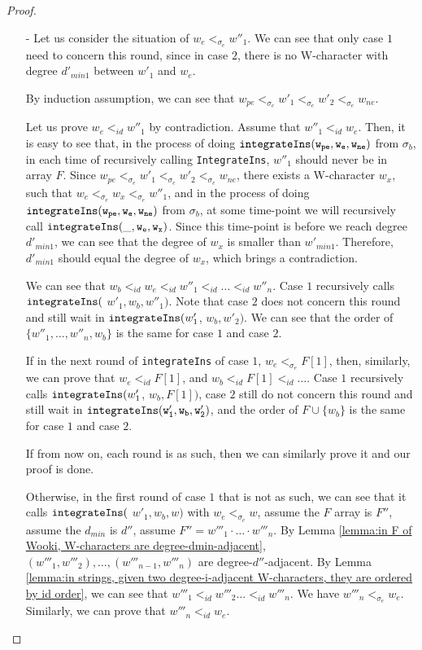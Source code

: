 \begin {proof}
\begin{itemize}
    \begin{itemize}
    \setlength{\itemsep}{0.5pt}
    \item[-] Let us consider the situation of $w_e <_{\sigma_e} w''_1$. We can see that only case $1$ need to concern this round, since in case $2$, there is no W-character with degree $d'_{min1}$ between $w'_1$ and $w_e$.

        By induction assumption, we can see that $w_{pe} <_{\sigma_e} w'_1 <_{\sigma_e} w'_2 <_{\sigma_e} w_{ne}$.

        Let us prove $w_e <_{id} w''_1$ by contradiction. Assume that $w''_1 <_{id} w_e$. Then, it is easy to see that, in the process of doing $\alabelshort[{\tt integrateIns}]{w_{pe},w_e,w_{ne}}$ from $\sigma_b$, in each time of recursively calling {\tt IntegrateIns}, $w''_1$ should never be in array $F$. Since $w_{pe} <_{\sigma_e} w'_1 <_{\sigma_e} w'_2 <_{\sigma_e} w_{ne}$, there exists a W-character $w_x$, such that $w_e <_{\sigma_e} w_x <_{\sigma_e} w''_1$, and in the process of doing $\alabelshort[{\tt integrateIns}]{w_{pe},w_e,w_{ne}}$ from $\sigma_b$, at some time-point we will recursively call $\alabelshort[{\tt integrateIns}]{\_,w_e,w_x}$. Since this time-point is before we reach degree $d'_{min1}$, we can see that the degree of $w_x$ is smaller than $w'_{min1}$. Therefore, $d'_{min1}$ should equal the degree of $w_x$, which brings a contradiction.

        We can see that $w_b <_{id} w_e <_{id} w''_1 <_{id} \ldots <_{id} w''_n$. Case $1$ recursively calls ${\tt integrateIns(}$ $w'_1,w_b,w''_1)$. Note that case $2$ does not concern this round and still wait in ${\tt integrateIns}(w'_1$, $w_b,w'_2)$. We can see that the order of $\{ w''_1,\ldots,w''_n,w_b \}$ is the same for case $1$ and case $2$.

        If in the next round of {\tt integrateIns} of case $1$, $w_e <_{\sigma_e} F[1]$, then, similarly, we can prove that $w_e <_{id} F[1]$, and $w_b <_{id} F[1] <_{id}\ldots$. Case $1$ recursively calls ${\tt integrateIns}(w'_1$, $w_b,F[1])$, case $2$ still do not concern this round and still wait in $\alabelshort[{\tt integrateIns}]{w'_1,w_b,w'_2}$, and the order of $F \cup \{ w_b \}$ is the same for case $1$ and case $2$.

        If from now on, each round is as such, then we can similarly prove it and our proof is done.

        Otherwise, in the first round of case $1$ that is not as such, we can see that it calls ${\tt integrateIns(}$ $w'_1,w_b,w)$ with $w_e <_{\sigma_e} w$, assume the $F$ array is $F''$, assume the $d_{min}$ is $d''$, assume $F'' = w'''_1 \cdot \ldots \cdot w'''_n$. By Lemma \ref{lemma:in F of Wooki, W-characters are degree-dmin-adjacent}, $(w'''_1,w'''_2),\ldots,(w'''_{n-1},w'''_n)$ are degree-$d''$-adjacent. By Lemma \ref{lemma:in strings, given two degree-i-adjacent W-characters, they are ordered by id order}, we can see that $w'''_1 <_{id} w'''_2 \ldots <_{id} w'''_n$. We have $w'''_n <_{\sigma_e} w_e$. Similarly, we can prove that $w'''_n <_{id} w_e$.


\end{itemize}
\end{itemize}
\end{proof}
